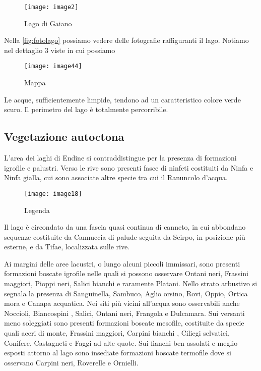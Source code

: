 \begin{figure}[H]
	\centering
	\texttt{[image: image2]}
	\caption{Lago di Gaiano}
	\label{fig:mesh1}
\end{figure}




Nella \cref{fig:fotolago} possiamo vedere delle fotografie raffiguranti il lago. Notiamo nel dettaglio 3 viste in cui possiamo 

\begin{wrapfigure}[9]{r}{0.5\textwidth}
	\centering
	\texttt{[image: image44]}
	\caption{Mappa}
\end{wrapfigure}

Le acque, sufficientemente limpide, tendono ad un caratteristico colore verde scuro.
Il perimetro del lago è totalmente percorribile.

\subsection{Vegetazione autoctona}




L'area dei laghi di Endine si contraddistingue per la presenza di formazioni igrofile e palustri. Verso le rive sono presenti fasce di ninfeti costituiti da Ninfa e Ninfa gialla, cui sono associate altre specie tra cui il Ranuncolo d’acqua.

\begin{wrapfigure}[23]{r}{0.5\textwidth}
	\centering
	\texttt{[image: image18]}
	\caption{Legenda}
\end{wrapfigure}

Il lago è circondato da una fascia quasi continua di canneto, in cui abbondano sequenze costituite da Cannuccia di palude seguita da Scirpo, in posizione più esterne, e da Tifae, localizzata sulle rive. 

Ai margini delle aree lacustri, o lungo alcuni piccoli immissari, sono presenti formazioni boscate igrofile nelle quali si possono osservare Ontani neri, Frassini maggiori, Pioppi neri, Salici bianchi e raramente Platani. Nello strato arbustivo si segnala la presenza di Sanguinella, Sambuco, Aglio orsino, Rovi, Oppio, Ortica mora e Canapa acquatica.  Nei siti più vicini all'acqua sono osservabili anche Noccioli, Biancospini , Salici, Ontani neri, Frangola e Dulcamara. Sui versanti meno soleggiati sono presenti formazioni boscate mesofile, costituite da specie quali aceri di monte, Frassini maggiori, Carpini bianchi , Ciliegi selvatici, Conifere, Castagneti e Faggi ad alte quote.  Sui fianchi ben assolati e meglio esposti attorno al lago sono insediate formazioni boscate termofile dove si osservano Carpini neri, Roverelle e Ornielli.

\pagebreak